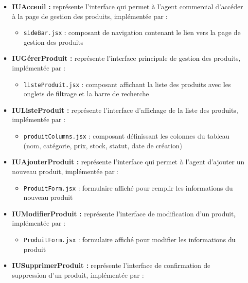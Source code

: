 \begin{itemize}[leftmargin=2em, topsep=4pt, itemsep=4pt]
  \item \textbf{IUAcceuil :} représente l'interface qui permet à l'agent commercial d'accéder à la page de gestion des produits, implémentée par :
  \begin{itemize}[leftmargin=2em, topsep=2pt, itemsep=2pt]
    \item \texttt{sideBar.jsx} : composant de navigation contenant le lien vers la page de gestion des produits
  \end{itemize}
  \item \textbf{IUGérerProduit :} représente l'interface principale de gestion des produits, implémentée par :
  \begin{itemize}[leftmargin=2em, topsep=2pt, itemsep=2pt]
    \item \texttt{listeProduit.jsx} : composant affichant la liste des produits avec les onglets de filtrage et la barre de recherche
  \end{itemize}
  \item \textbf{IUListeProduit :} représente l'interface d'affichage de la liste des produits, implémentée par :
  \begin{itemize}[leftmargin=2em, topsep=2pt, itemsep=2pt]
    \item \texttt{produitColumns.jsx} : composant définissant les colonnes du tableau (nom, catégorie, prix, stock, statut, date de création)
  \end{itemize}
  \item \textbf{IUAjouterProduit :} représente l'interface qui permet à l'agent d'ajouter un nouveau produit, implémentée par :
  \begin{itemize}[leftmargin=2em, topsep=2pt, itemsep=2pt]
    \item \texttt{ProduitForm.jsx} : formulaire affiché pour remplir les informations du nouveau produit
  \end{itemize}
  \item \textbf{IUModifierProduit :} représente l'interface de modification d'un produit, implémentée par :
  \begin{itemize}[leftmargin=2em, topsep=2pt, itemsep=2pt]
    \item \texttt{ProduitForm.jsx} : formulaire affiché pour modifier les informations du produit
  \end{itemize}
  \item \textbf{IUSupprimerProduit :} représente l'interface de confirmation de suppression d'un produit, implémentée par :

\end{itemize}
